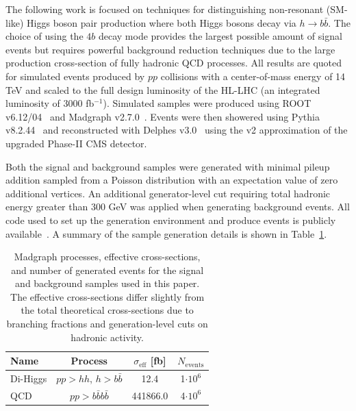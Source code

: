 The following work is focused on techniques for distinguishing non-resonant (SM-like) Higgs boson pair production where both Higgs bosons decay via $h \to b \bar{b}$. The choice of using the $4b$ decay mode provides the largest possible amount of signal events but requires powerful background reduction techniques due to the large production cross-section of fully hadronic QCD processes. All results are quoted for simulated events produced by $pp$ collisions with a center-of-mass energy of 14 TeV and scaled to the full design luminosity of the HL-LHC (an integrated luminosity of 3000 fb$^{-1}$). Simulated samples were produced using ROOT v6.12/04~\cite{Brun:1997pa} and Madgraph v2.7.0~\cite{Alwall:2014hca}. Events were then showered using Pythia v8.2.44~\cite{Sj_strand_2015} and reconstructed with Delphes v3.0~\cite{de_Favereau_2014} using the v2 approximation of the upgraded Phase-II CMS detector.

Both the signal and background samples were generated with minimal pileup addition sampled from a Poisson distribution with an expectation value of zero additional vertices. An additional generator-level cut requiring total hadronic energy greater than 300 GeV was applied when generating background events. All code used to set up the generation environment and produce events is publicly available~\cite{github}. A summary of the sample generation details is shown in Table~\ref{tab:samples}.

\begin{table}[ht!]
 \label{tab:samples}
\centering
    \begin{tabular}{|l|c|c|c|} %
      \hline\hline
      Name & Process & $\sigma_{\textrm{eff}}$ [fb] & $N_{\textrm{events}}$ \\
      \hline
      Di-Higgs & $p p > h h$, $h > b \bar{b}$ & 12.4 & 1$\cdot 10^6$ \\
      QCD     & $p p > b \bar{b} b \bar{b}$ & 441866.0 & 4$\cdot 10^6$ \\
      \hline\hline
    \end{tabular}
\caption{Madgraph processes, effective cross-sections, and number of generated events for the signal and background samples used in this paper. The effective cross-sections differ slightly from the total theoretical cross-sections due to branching fractions and generation-level cuts on hadronic activity.}
\end{table}

